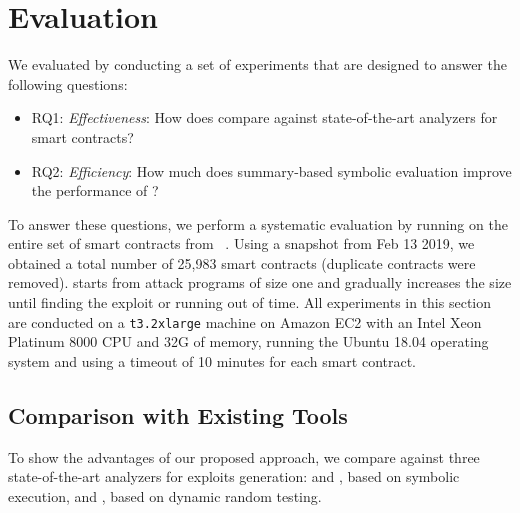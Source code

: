 \section{Evaluation}\label{sec:eval}
We evaluated \toolname by conducting a set of experiments that are designed to answer the following questions: 
\begin{itemize}
\item RQ1: \emph{Effectiveness}: How does \toolname compare against state-of-the-art analyzers for smart contracts?
\item RQ2: \emph{Efficiency}: How much does summary-based symbolic 
evaluation improve the performance of \toolname?
\end{itemize}

To answer these questions, we perform a systematic evaluation by running
\toolname on the entire set of smart contracts from \etherscan~\cite{etherscan}.
Using a snapshot from Feb 13 2019, we obtained a total number of 25,983 smart
contracts (duplicate contracts were removed). \toolname starts from attack programs of size one and gradually increases
the size until finding the exploit or running out of time. All experiments in this section are
conducted on a \texttt{t3.2xlarge} machine on Amazon EC2 with an Intel Xeon
Platinum 8000 CPU and 32G of memory, running the Ubuntu 18.04 operating system
and using a timeout of 10 minutes for each smart contract.

\subsection{Comparison with Existing Tools}\label{sec:comp}
To show the advantages of our proposed approach, we compare \toolname against three
state-of-the-art analyzers for exploits generation: \mythril and \teether, based on 
symbolic execution, and \contractfuzz, based on dynamic random testing.





% 
